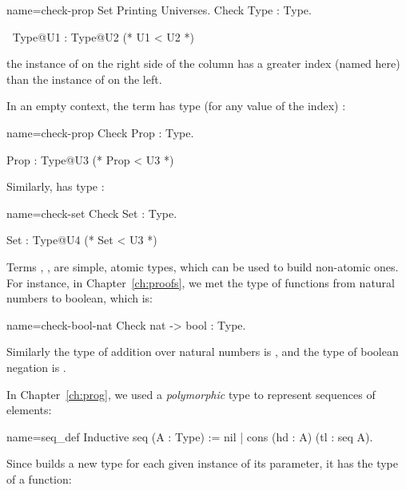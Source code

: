 \begin{coq-left}{name=check-prop}{}
Set Printing Universes.
Check Type : Type.
\end{coq-left}
\begin{coqout-right}
$~$
Type@{U1} : Type@{U2} (* U1 < U2 *)
\end{coqout-right}

the instance of  on the right side of the column has a greater
index (named  here) than the instance of  on the left.

In an empty context,
the term  has type  (for any value of the index) :

\begin{coq-left}{name=check-prop}{}
Check Prop : Type.
\end{coq-left}
\begin{coqout-right}
Prop : Type@{U3} (* Prop < U3 *)
\end{coqout-right}

Similarly,  has type :

\begin{coq-left}{name=check-set}{}
Check Set : Type.
\end{coq-left}
\begin{coqout-right}
Set : Type@{U4} (* Set < U3 *)
\end{coqout-right}

Terms , ,  are simple, atomic types, which can be used
to build non-atomic ones. For instance, in Chapter~\ref{ch:proofs}, we
met the type of functions from natural numbers to boolean, which is:

\begin{coq}{name=check-bool-nat}{}
Check nat -> bool : Type.
\end{coq}

Similarly the type of addition over natural numbers is 
, and the type of boolean negation is 
.

In Chapter~\ref{ch:prog}, we used a \emph{polymorphic} type to represent
sequences of elements:

\begin{coq}{name=seq_def}{}
Inductive seq (A : Type) := nil | cons (hd : A) (tl : seq A).
\end{coq}

Since  builds a new type for each given instance of its
parameter, it has the type of a function:

